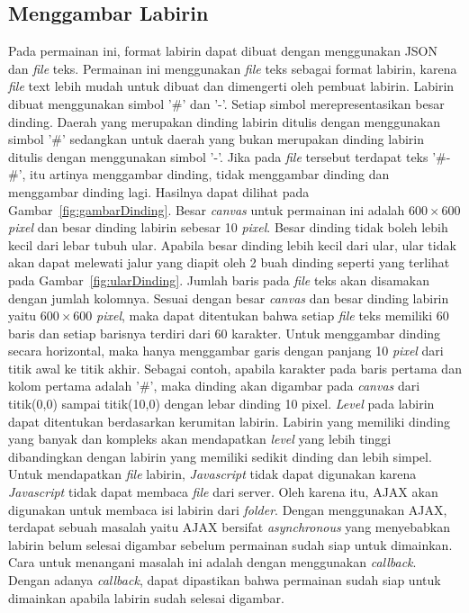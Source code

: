 \subsection{Menggambar Labirin}
Pada permainan ini, format labirin dapat dibuat dengan menggunakan JSON dan \textit{file} teks. Permainan ini menggunakan \textit{file} teks sebagai format labirin, karena \textit{file} text lebih mudah untuk dibuat dan dimengerti oleh pembuat labirin. Labirin dibuat menggunakan simbol '\#' dan '-'. Setiap simbol merepresentasikan besar dinding. Daerah yang merupakan dinding labirin ditulis dengan menggunakan simbol '\#' sedangkan untuk daerah yang bukan merupakan dinding labirin ditulis dengan menggunakan simbol '-'. Jika pada \textit{file} tersebut terdapat teks '\#-\#', itu artinya menggambar dinding, tidak menggambar dinding dan menggambar dinding lagi. Hasilnya dapat dilihat pada Gambar~\ref{fig:gambarDinding}. Besar \textit{canvas} untuk permainan ini adalah $600 \times 600$ \textit{pixel} dan besar dinding labirin sebesar 10 \textit{pixel}. Besar dinding tidak boleh lebih kecil dari lebar tubuh ular. Apabila besar dinding lebih kecil dari ular, ular tidak akan dapat melewati jalur yang diapit oleh 2 buah dinding seperti yang terlihat pada Gambar~\ref{fig:ularDinding}. Jumlah baris pada \textit{file} teks akan disamakan dengan jumlah kolomnya. Sesuai dengan besar \textit{canvas} dan besar dinding labirin yaitu $600 \times 600$ \textit{pixel}, maka dapat ditentukan bahwa setiap \textit{file} teks memiliki 60 baris dan setiap barisnya terdiri dari 60 karakter. Untuk menggambar dinding secara horizontal, maka hanya menggambar garis dengan panjang 10 \textit{pixel} dari titik awal ke titik akhir. Sebagai contoh, apabila karakter pada baris pertama dan kolom pertama adalah '\#', maka dinding akan digambar pada \textit{canvas} dari titik(0,0) sampai titik(10,0) dengan lebar dinding 10 pixel. \textit{Level} pada labirin dapat ditentukan berdasarkan kerumitan labirin. Labirin yang memiliki dinding yang banyak dan kompleks akan mendapatkan \textit{level} yang lebih tinggi dibandingkan dengan labirin yang memiliki sedikit dinding dan lebih simpel. \\

Untuk mendapatkan \textit{file} labirin, \textit{Javascript} tidak dapat digunakan karena \textit{Javascript} tidak dapat membaca \textit{file} dari server. Oleh karena itu, AJAX akan digunakan untuk membaca isi labirin dari \textit{folder}. Dengan menggunakan AJAX, terdapat sebuah masalah yaitu AJAX bersifat \textit{asynchronous} yang menyebabkan labirin belum selesai digambar sebelum permainan sudah siap untuk dimainkan. Cara untuk menangani masalah ini adalah dengan menggunakan \textit{callback}. Dengan adanya \textit{callback}, dapat dipastikan bahwa permainan sudah siap untuk dimainkan apabila labirin sudah selesai digambar.\\ 

